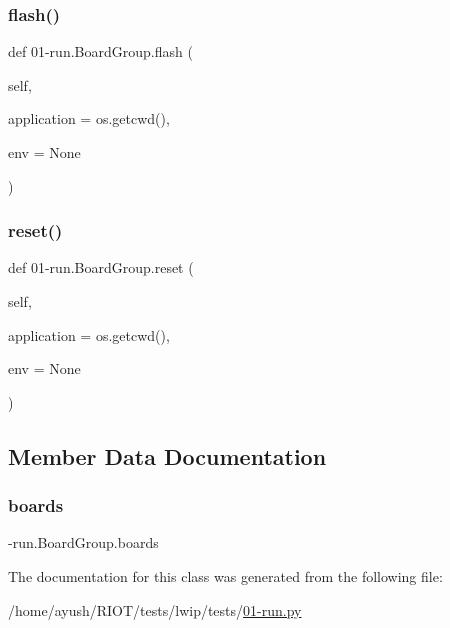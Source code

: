 \mbox{\label{class01-run_1_1BoardGroup_a5211ec05b65869e7007d8b5c003f4b7b}} 
\subsubsection{\texorpdfstring{flash()}{flash()}}
{\footnotesize\ttfamily def 01-\/run.\+Board\+Group.\+flash (\begin{DoxyParamCaption}\item[{}]{self,  }\item[{}]{application = {\ttfamily os.getcwd()},  }\item[{}]{env = {\ttfamily None} }\end{DoxyParamCaption})}

\mbox{\label{class01-run_1_1BoardGroup_a9f63a54bde35775e751102a2852ac9c3}} 
\subsubsection{\texorpdfstring{reset()}{reset()}}
{\footnotesize\ttfamily def 01-\/run.\+Board\+Group.\+reset (\begin{DoxyParamCaption}\item[{}]{self,  }\item[{}]{application = {\ttfamily os.getcwd()},  }\item[{}]{env = {\ttfamily None} }\end{DoxyParamCaption})}



\subsection{Member Data Documentation}
\mbox{\label{class01-run_1_1BoardGroup_a4787c8cf92a9886de709f4672871e97d}} 
\subsubsection{\texorpdfstring{boards}{boards}}
{\footnotesize{}-\/run.\+Board\+Group.\+boards}



The documentation for this class was generated from the following file\+:\begin{DoxyCompactItemize}
\item 
/home/ayush/\+R\+I\+O\+T/tests/lwip/tests/\hyperlink{lwip_2tests_201-run_8py}{01-\/run.\+py}\end{DoxyCompactItemize}
